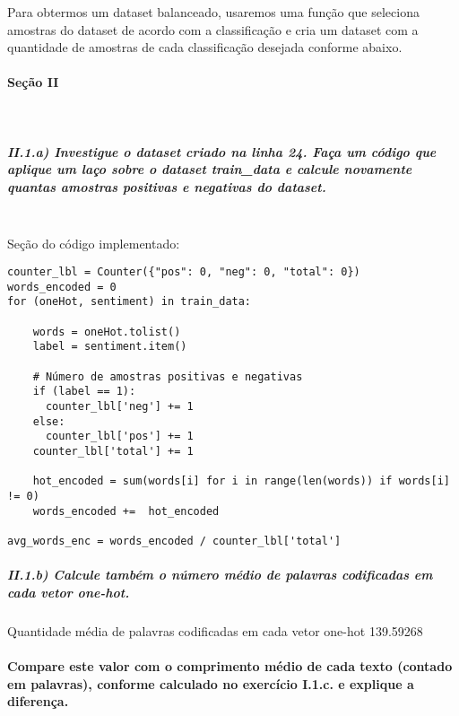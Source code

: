 \documentclass[11pt]{article}
\begin{document}
Para obtermos um dataset balanceado, usaremos uma função que seleciona
amostras do dataset de acordo com a classificação e cria um dataset com
a quantidade de amostras de cada classificação desejada conforme abaixo.

    \paragraph{Seção II}\label{seuxe7uxe3o-ii}\mbox{} \\

\subparagraph{II.1.a) Investigue o dataset criado na linha 24. Faça um
código que aplique um laço sobre o dataset train\_data e calcule
novamente quantas amostras positivas e negativas do
dataset.}\label{ii.1.a-investigue-o-dataset-criado-na-linha-24.-fauxe7a-um-cuxf3digo-que-aplique-um-lauxe7o-sobre-o-dataset-train_data-e-calcule-novamente-quantas-amostras-positivas-e-negativas-do-dataset.}\mbox{} \\

Seção do código implementado:

\begin{verbatim}
counter_lbl = Counter({"pos": 0, "neg": 0, "total": 0})
words_encoded = 0
for (oneHot, sentiment) in train_data:

    words = oneHot.tolist()
    label = sentiment.item()

    # Número de amostras positivas e negativas
    if (label == 1):
      counter_lbl['neg'] += 1
    else:
      counter_lbl['pos'] += 1
    counter_lbl['total'] += 1

    hot_encoded = sum(words[i] for i in range(len(words)) if words[i] != 0)
    words_encoded +=  hot_encoded

avg_words_enc = words_encoded / counter_lbl['total']
\end{verbatim}

\subparagraph{II.1.b) Calcule também o número médio de palavras
codificadas em cada vetor
one-hot.}\label{ii.1.b-calcule-tambuxe9m-o-nuxfamero-muxe9dio-de-palavras-codificadas-em-cada-vetor-one-hot.}

Quantidade média de palavras codificadas em cada vetor one-hot 139.59268

\paragraph{Compare este valor com o comprimento médio de cada texto
(contado em palavras), conforme calculado no exercício I.1.c. e explique
a
diferença.}\label{compare-este-valor-com-o-comprimento-muxe9dio-de-cada-texto-contado-em-palavras-conforme-calculado-no-exercuxedcio-i.1.c.-e-explique-a-diferenuxe7a.}\mbox{} \\
\end{document}
